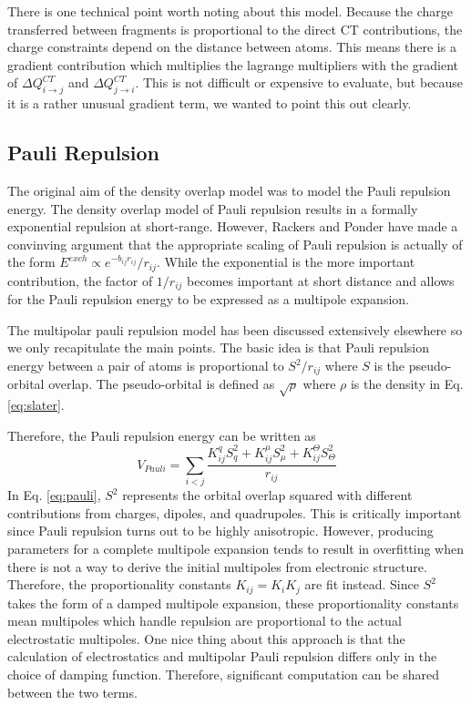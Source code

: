 \documentclass[journal=jacsat,manuscript=article]{achemso}
\begin{document}
There is one technical point worth noting about this model. Because the charge transferred between fragments is proportional to the direct CT contributions, the charge constraints depend on the distance between atoms. This means there is a gradient contribution which multiplies the lagrange multipliers with the gradient of $\Delta Q^{CT}_{i\rightarrow j}$ and $\Delta Q^{CT}_{j\rightarrow i}$. This is not difficult or expensive to evaluate, but because it is a rather unusual gradient term, we wanted to point this out clearly.

\subsection*{Pauli Repulsion}
The original aim of the density overlap model was to model the Pauli repulsion energy.\cite{wallqvist1989new,wheatley1990overlap,gordon1996approximate} The density overlap model of Pauli repulsion results in a formally exponential repulsion at short-range. However, Rackers and Ponder have made a convinving argument that the appropriate scaling of Pauli repulsion is actually of the form $E^{exch}\propto e^{-b_{ij}r_{ij}}/r_{ij}$.\cite{rackers2019classical,rackers2021polarizable} While the exponential is the more important contribution, the factor of $1/r_{ij}$ becomes important at short distance and allows for the Pauli repulsion energy to be expressed as a multipole expansion.

The multipolar pauli repulsion model has been discussed extensively elsewhere\cite{rackers2019classical} so we only recapitulate the main points. The basic idea is that Pauli repulsion energy between a pair of atoms is proportional to $S^2/r_{ij}$ where $S$ is the pseudo-orbital overlap. The pseudo-orbital is defined as $\sqrt{\rho}$ where $\rho$ is the density in Eq. \ref{eq:slater}.

Therefore, the Pauli repulsion energy can be written as
\begin{equation}
  V_{Pauli}=\sum_{i<j}\frac{K_{ij}^q S^2_{q}+K_{ij}^\mu S^2_{\mu}+K_{ij}^\Theta S^2_{\Theta}}{r_{ij}}
\label{eq:pauli}
\end{equation}
\noindent
In Eq. \ref{eq:pauli}, $S^2$ represents the orbital overlap squared with different contributions from charges, dipoles, and quadrupoles. This is critically important since Pauli repulsion turns out to be highly anisotropic. However, producing parameters for a complete multipole expansion tends to result in overfitting when there is not a way to derive the initial multipoles from electronic structure. Therefore, the proportionality constants $K_{ij}=K_iK_j$ are fit instead. Since $S^2$ takes the form of a damped multipole expansion\cite{rackers2019classical}, these proportionality constants mean multipoles which handle repulsion are proportional to the actual electrostatic multipoles. One nice thing about this approach is that the calculation of electrostatics and multipolar Pauli repulsion differs only in the choice of damping function. Therefore, significant computation can be shared between the two terms.
\end{document}
